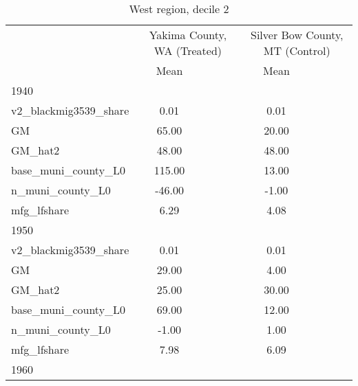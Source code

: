 \begin{table}[htbp]\centering
\def\sym#1{\ifmmode^{#1}\else\(^{#1}\)\fi}
\caption{West region, decile 2 \label{tab1}}
\begin{tabular}{l*{2}{ccc}}
\toprule
                    &\multicolumn{3}{c}{Yakima County, WA (Treated)}&\multicolumn{3}{c}{Silver Bow County, MT (Control)}\\
                    &        Mean&            &            &        Mean&            &            \\
\midrule
1940                &            &            &            &            &            &            \\
v2\_blackmig3539\_share&        0.01&            &            &        0.01&            &            \\
GM                  &       65.00&            &            &       20.00&            &            \\
GM\_hat2             &       48.00&            &            &       48.00&            &            \\
base\_muni\_county\_L0 &      115.00&            &            &       13.00&            &            \\
n\_muni\_county\_L0    &      -46.00&            &            &       -1.00&            &            \\
mfg\_lfshare         &        6.29&            &            &        4.08&            &            \\
\midrule
1950                &            &            &            &            &            &            \\
v2\_blackmig3539\_share&        0.01&            &            &        0.01&            &            \\
GM                  &       29.00&            &            &        4.00&            &            \\
GM\_hat2             &       25.00&            &            &       30.00&            &            \\
base\_muni\_county\_L0 &       69.00&            &            &       12.00&            &            \\
n\_muni\_county\_L0    &       -1.00&            &            &        1.00&            &            \\
mfg\_lfshare         &        7.98&            &            &        6.09&            &            \\
\midrule
1960                &            &            &            &            &            &            \\

\end{tabular}
\end{table}
